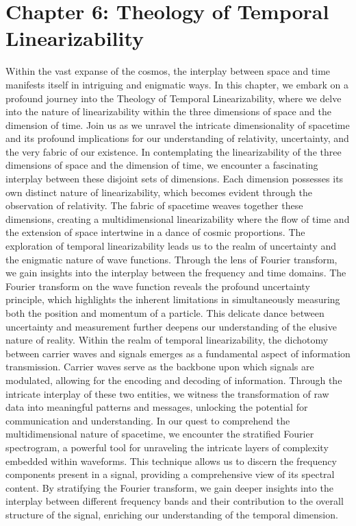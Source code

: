 \documentclass[ebook,12pt,oneside,openany]{memoir}
\begin{document}
\chapter*{Chapter 6: Theology of Temporal Linearizability}
Within the vast expanse of the cosmos, the interplay between space and time manifests itself in intriguing and enigmatic ways. In this chapter, we embark on a profound journey into the Theology of Temporal Linearizability, where we delve into the nature of linearizability within the three dimensions of space and the dimension of time. Join us as we unravel the intricate dimensionality of spacetime and its profound implications for our understanding of relativity, uncertainty, and the very fabric of our existence.
In contemplating the linearizability of the three dimensions of space and the dimension of time, we encounter a fascinating interplay between these disjoint sets of dimensions. Each dimension possesses its own distinct nature of linearizability, which becomes evident through the observation of relativity. The fabric of spacetime weaves together these dimensions, creating a multidimensional linearizability where the flow of time and the extension of space intertwine in a dance of cosmic proportions.
The exploration of temporal linearizability leads us to the realm of uncertainty and the enigmatic nature of wave functions. Through the lens of Fourier transform, we gain insights into the interplay between the frequency and time domains. The Fourier transform on the wave function reveals the profound uncertainty principle, which highlights the inherent limitations in simultaneously measuring both the position and momentum of a particle. This delicate dance between uncertainty and measurement further deepens our understanding of the elusive nature of reality.
Within the realm of temporal linearizability, the dichotomy between carrier waves and signals emerges as a fundamental aspect of information transmission. Carrier waves serve as the backbone upon which signals are modulated, allowing for the encoding and decoding of information. Through the intricate interplay of these two entities, we witness the transformation of raw data into meaningful patterns and messages, unlocking the potential for communication and understanding.
In our quest to comprehend the multidimensional nature of spacetime, we encounter the stratified Fourier spectrogram, a powerful tool for unraveling the intricate layers of complexity embedded within waveforms. This technique allows us to discern the frequency components present in a signal, providing a comprehensive view of its spectral content. By stratifying the Fourier transform, we gain deeper insights into the interplay between different frequency bands and their contribution to the overall structure of the signal, enriching our understanding of the temporal dimension.
\end{document}
